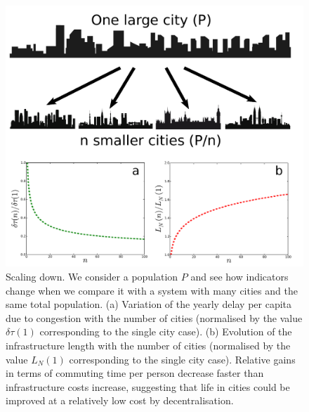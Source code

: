 \begin{figure}
\includegraphics[width=\linewidth]{gfx/chapter-scaling/figure_4.pdf}
\caption{Scaling down. We consider a population $P$ and see how indicators change when we compare it with a system with many cities and the same total population. (a) Variation of the yearly delay per capita due to congestion with the number of cities (normalised by the value $\delta\tau(1)$ corresponding to the single city case). (b) Evolution of the infrastructure length with the number of cities (normalised by the value $L_N(1)$ corresponding to the single city case). Relative gains in terms of commuting time per person decrease faster than infrastructure costs increase, suggesting that life in cities could be improved at a relatively low cost by decentralisation.}
\end{figure}


